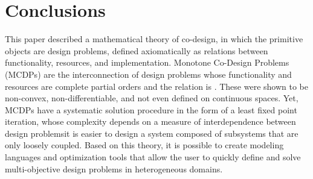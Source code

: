 \section{Conclusions}

This paper described a mathematical theory of co-design, in which
the primitive objects are design problems, defined axiomatically as
relations between functionality, resources, and implementation. Monotone
Co-Design Problems (MCDPs) are the interconnection of design problems
whose functionality and resources are complete partial orders and
the relation is \scottcontinuous. These were shown to be non-convex,
non-differentiable, and not even defined on continuous spaces. Yet,
MCDPs have a systematic solution procedure in the form of a least
fixed point iteration, whose complexity depends on a measure of interdependence
between design problems\textemdash it is easier to design a system
composed of subsystems that are only loosely coupled. Based on this
theory, it is possible to create modeling languages and optimization
tools that allow the user to quickly define and solve multi-objective
design problems in heterogeneous domains. 

\textbf{\small{}}{\small \par}






\footnotesize



\setcounter{page}{1}


\printbibliography




